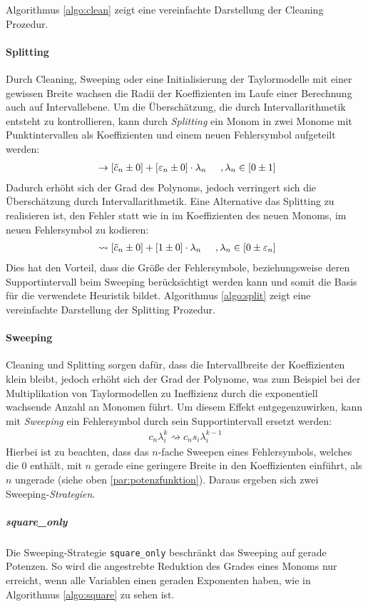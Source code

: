 Algorithmus \ref{algo:clean} zeigt eine vereinfachte Darstellung der Cleaning Prozedur.


    

\paragraph{Splitting}
Durch Cleaning, Sweeping oder eine Initialisierung der Taylormodelle mit einer gewissen Breite wachsen die Radii der Koeffizienten im Laufe einer Berechnung auch auf Intervallebene. Um die Überschätzung, die durch Intervallarithmetik entsteht zu kontrollieren, kann durch \textit{Splitting} ein Monom in zwei Monome mit Punktintervallen als Koeffizienten und einem neuen Fehlersymbol aufgeteilt werden:
\begin{align*}
[\tilde{c}_n \pm \varepsilon_n]\ \rightarrow [\tilde{c}_n \pm 0] + [\varepsilon_n \pm 0]\cdot  \lambda_n \hspace{0.5cm}, \lambda_n \in [0 \pm 1]
\end{align*}
Dadurch erhöht sich der Grad des Polynoms, jedoch verringert sich die Überschätzung durch Intervallarithmetik. Eine Alternative das Splitting zu realisieren ist, den Fehler statt wie in \cite{DBLP:conf/macis/BrausseKM15} im Koeffizienten des neuen Monoms, im neuen Fehlersymbol zu kodieren:
\begin{align*}
 [\tilde{c}_n \pm \varepsilon_n]\ \rightsquigarrow [\tilde{c}_n \pm 0] + [1 \pm 0]\cdot  \lambda_n \hspace{0.5cm}, \lambda_n \in [0 \pm \varepsilon_n]
\end{align*}
Dies hat den Vorteil, dass die Größe der Fehlersymbole, beziehungsweise deren Supportintervall beim Sweeping berücksichtigt werden kann und somit die Basis für die verwendete Heuristik bildet.
Algorithmus \ref{algo:split} zeigt eine vereinfachte Darstellung der Splitting Prozedur.



\paragraph{Sweeping}
Cleaning und Splitting sorgen dafür, dass die Intervallbreite der Koeffizienten klein bleibt, jedoch erhöht sich der Grad der Polynome, was zum Beispiel bei der Multiplikation von Taylormodellen zu Ineffizienz durch die exponentiell wachsende Anzahl an Monomen führt. Um diesem Effekt entgegenzuwirken, kann mit \textit{Sweeping} ein Fehlersymbol durch sein Supportintervall ersetzt werden:
\begin{align*}
 c_n \lambda_i^k \rightsquigarrow c_n s_i \lambda_i^{k-1}
\end{align*}
Hierbei ist zu beachten, dass das $n$-fache Sweepen eines Fehlersymbols, welches die 0 enthält, mit $n$ gerade eine geringere Breite in den Koeffizienten einführt, als $n$ ungerade (siehe oben \ref{par:potenzfunktion}). Daraus ergeben sich zwei Sweeping-\textit{Strategien}.
\subparagraph{square\_only}
Die Sweeping-Strategie \verb+square_only+ beschränkt das Sweeping auf gerade Potenzen. So wird die angestrebte Reduktion des Grades eines Monoms nur erreicht, wenn alle Variablen einen geraden Exponenten haben, wie in Algorithmus \ref{algo:square} zu sehen ist.




